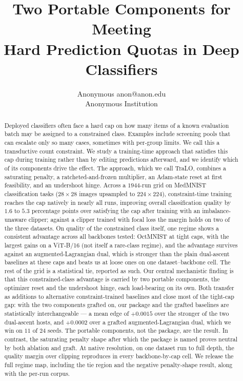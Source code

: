 \documentclass[10pt]{article}
\title{Two Portable Components for Meeting\\
Hard Prediction Quotas in Deep Classifiers}
\author{\name Anonymous \email anon@anon.edu \\
      \addr Anonymous Institution}
\begin{document}
\maketitle

\begin{abstract}
Deployed classifiers often face a hard cap on how many items of a known
evaluation batch may be assigned to a constrained class. Examples include
screening pools that can escalate only so many cases, sometimes with
per-group limits. We call this a transductive count constraint. We study
a training-time approach that satisfies this cap {during training rather than by editing
predictions afterward}, and we identify which of its components
drive the effect. The approach, which we call TraLO, combines a
saturating penalty, a ratcheted-and-frozen multiplier, an Adam-state
reset at first feasibility, and an undershoot hinge. Across a $1944$-run
grid on MedMNIST classification tasks ($28{\times}28$ images upsampled to
$224{\times}224$), constraint-time training reaches the cap natively in
nearly all runs, improving overall classification quality by $1.6$ to
$5.3$ percentage points over satisfying the cap after training
{with an imbalance-unaware clipper; against a clipper trained with
focal loss the margin holds on two of the three datasets}. On
quality of the constrained class itself, one regime shows a consistent
advantage across all backbones tested: OctMNIST at tight caps, with the
largest gains on a ViT{-B/16} (not itself a rare-class regime){, and the
advantage survives against an augmented-Lagrangian dual, which is stronger than
the plain dual-ascent baselines at these caps and beats us at loose ones on one
dataset--backbone cell}. The rest of
the grid is a statistical tie, reported as such. Our central
mechanistic finding is that this constrained-class advantage is carried
by two portable components, the optimizer reset and the undershoot
hinge{, each load-bearing on its own}. Both transfer as additions to
alternative constraint-trained
baselines and close most of the tight-cap gap{: with the two
components grafted on, our package and the grafted baselines are statistically
interchangeable --- a mean edge of $+0.0015$ over the stronger of the two
dual-ascent hosts, and $+0.0002$ over a grafted augmented-Lagrangian dual, which
we win on $11$ of $24$ seeds. The portable
components, not the package, are the result}. In contrast, the
saturating penalty shape after which the package is named proves neutral
by both ablation and graft. 
{At native resolution, on one dataset run to full depth, the
quality margin over clipping reproduces in every backbone-by-cap cell.}
We release the full regime map, including the tie region
and the negative penalty-shape result, along with the per-run corpus.
\end{abstract}
\end{document}
